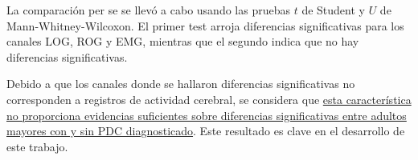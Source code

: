 La comparaci\'on per se se llev\'o a cabo usando las pruebas %
$t$ de Student y $U$ de Mann-Whitney-Wilcoxon.
El primer test arroja diferencias significativas para los canales LOG, ROG y EMG, mientras que
el segundo indica que no hay diferencias significativas. 

Debido a que los canales
donde se hallaron diferencias significativas no corresponden a registros de actividad
cerebral, se considera que \underline{esta caracter\'istica no proporciona evidencias
suficientes sobre diferencias significativas entre adultos mayores con y sin PDC diagnosticado}.
Este resultado es clave en el desarrollo de este trabajo.

%

